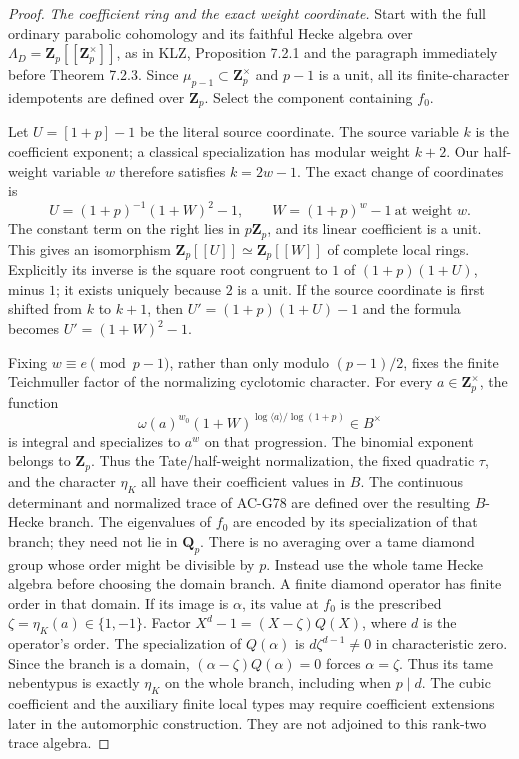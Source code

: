 \begin{proof}
\emph{The coefficient ring and the exact weight coordinate.}
Start with the full ordinary parabolic cohomology and its faithful
Hecke algebra over
\(\Lambda_D=\mathbf Z_p[[\mathbf Z_p^\times]]\), as in KLZ,
Proposition 7.2.1 and the paragraph immediately before Theorem
7.2.3. Since \(\mu_{p-1}\subset\mathbf Z_p^\times\) and \(p-1\)
is a unit, all its finite-character idempotents are defined over
\(\mathbf Z_p\). Select the component containing \(f_0\).

Let \(U=[1+p]-1\) be the literal source coordinate. The source
variable \(k\) is the coefficient exponent; a classical
specialization has modular weight \(k+2\).
Our half-weight variable \(w\) therefore satisfies \(k=2w-1\).
The exact change of coordinates is
\[
  U=(1+p)^{-1}(1+W)^2-1,
  \qquad W=(1+p)^w-1\ \text{at weight }w.
 \tag{G88.7}
\]
The constant term on the right lies in \(p\mathbf Z_p\), and its
linear coefficient is a unit. This gives an isomorphism
\(\mathbf Z_p[[U]]\simeq\mathbf Z_p[[W]]\) of complete local
rings. Explicitly its inverse is the square root congruent to
\(1\) of \((1+p)(1+U)\), minus \(1\); it exists uniquely because
\(2\) is a unit. If the source coordinate is first shifted from
\(k\) to \(k+1\), then \(U'=(1+p)(1+U)-1\) and the formula becomes
\(U'=(1+W)^2-1\).

Fixing \(w\equiv e\pmod{p-1}\), rather than only modulo
\((p-1)/2\), fixes the finite Teichmuller factor of the normalizing
cyclotomic character. For every \(a\in\mathbf Z_p^\times\), the
function
\[
 \omega(a)^{w_0}
 (1+W)^{\log\langle a\rangle/\log(1+p)}
 \in B^\times
 \tag{G88.8}
\]
is integral and specializes to \(a^w\) on that progression.
The binomial exponent belongs to \(\mathbf Z_p\).
Thus the Tate/half-weight normalization, the fixed quadratic
\(\tau\), and the character \(\eta_K\) all have their coefficient
values in \(B\). The continuous determinant and normalized trace
of AC-G78 are defined over the resulting \(B\)-Hecke branch.
The eigenvalues of \(f_0\) are encoded by its specialization of
that branch; they need not lie in \(\mathbf Q_p\).
There is no averaging over a tame diamond group whose order
might be divisible by \(p\). Instead use the whole tame Hecke
algebra before choosing the domain branch. A finite diamond
operator has finite order in that domain. If its image is
\(\alpha\), its value at \(f_0\) is the prescribed
\(\zeta=\eta_K(a)\in\{1,-1\}\). Factor
\(X^d-1=(X-\zeta)Q(X)\), where \(d\) is the operator's order.
The specialization of \(Q(\alpha)\) is \(d\zeta^{d-1}\ne0\)
in characteristic zero. Since the branch is a domain,
\((\alpha-\zeta)Q(\alpha)=0\) forces \(\alpha=\zeta\).
Thus its tame nebentypus is exactly \(\eta_K\) on the
whole branch, including when \(p\mid d\).
The cubic coefficient and the auxiliary finite local types may
require coefficient extensions later in the automorphic
construction. They are not adjoined to this rank-two trace
algebra.


\end{proof}
